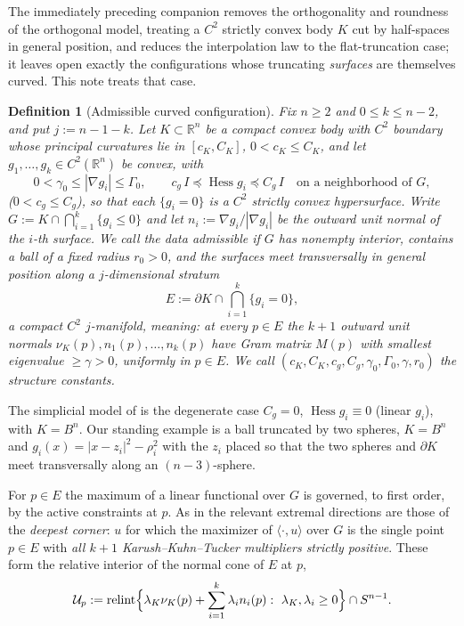 \documentclass[11pt]{article}
\newtheorem{definition}[theorem]{Definition}
\newcommand{\R}{\mathbb{R}}
\newcommand{\Hess}{\operatorname{Hess}}
\begin{document}
The immediately preceding companion \cite{companion9} removes the orthogonality
and roundness of the orthogonal model, treating a $C^2$ strictly convex body $K$
cut by half-spaces in general position, and reduces the interpolation law to the
flat-truncation case; it leaves open exactly the configurations whose truncating
\emph{surfaces} are themselves curved.  This note treats that case.

\begin{definition}[Admissible curved configuration]\label{def:config}
Fix $n\ge2$ and $0\le k\le n-2$, and put $j:=n-1-k$.  Let
$K\subset\R^n$ be a compact convex body with $C^2$ boundary whose principal
curvatures lie in $[c_K,C_K]$, $0<c_K\le C_K$, and let
$g_1,\dots,g_k\in C^2(\R^n)$ be convex, with
\begin{equation}\label{eq:reg}
0<\gamma_0\le|\nabla g_i|\le\Gamma_0,
\qquad
c_g\,I\preceq\Hess g_i\preceq C_g\,I
\quad\text{on a neighborhood of }G,
\end{equation}
($0<c_g\le C_g$), so that each $\{g_i=0\}$ is a $C^2$ strictly convex
hypersurface.  Write
$G:=K\cap\bigcap_{i=1}^k\{g_i\le0\}$ and let $n_i:=\nabla g_i/|\nabla g_i|$ be
the outward unit normal of the $i$-th surface.  We call the data
\emph{admissible} if $G$ has nonempty interior, contains a ball of a fixed
radius $r_0>0$, and the surfaces meet \emph{transversally in general position
along a $j$-dimensional stratum}
\[
E:=\partial K\cap\bigcap_{i=1}^k\{g_i=0\},
\]
a compact $C^2$ $j$-manifold, meaning: at every $p\in E$ the $k+1$ outward unit
normals $\nu_K(p),n_1(p),\dots,n_k(p)$ have Gram matrix
$M(p)$ with smallest eigenvalue $\ge\gamma>0$, uniformly in $p\in E$.  We call
$(c_K,C_K,c_g,C_g,\gamma_0,\Gamma_0,\gamma,r_0)$ the \emph{structure constants}.
\end{definition}

The simplicial model of \cite{companion11} is the degenerate case $C_g=0$,
$\Hess g_i\equiv0$ (linear $g_i$), with $K=B^n$.  Our standing example is a
ball truncated by two spheres, $K=B^n$ and
$g_i(x)=|x-z_i|^2-\rho_i^2$ with the $z_i$ placed so that the two spheres and
$\partial K$ meet transversally along an $(n-3)$-sphere.

For $p\in E$ the maximum of a linear functional over $G$ is governed, to first
order, by the active constraints at $p$.  As in \cite{companion11} the relevant
extremal directions are those of the \emph{deepest corner}: $u$ for which the
maximizer of $\langle\cdot,u\rangle$ over $G$ is the single point $p\in E$ with
\emph{all $k+1$ Karush--Kuhn--Tucker multipliers strictly positive}.  These
form the relative interior of the normal cone of $E$ at $p$,
\[
\mathcal U_p:=\operatorname{relint}\Bigl\{\lambda_K\nu_K(p)+\sum_{i=1}^k\lambda_i n_i(p):
\ \lambda_K,\lambda_i\ge0\Bigr\}\cap S^{n-1}.
\]
\end{document}
